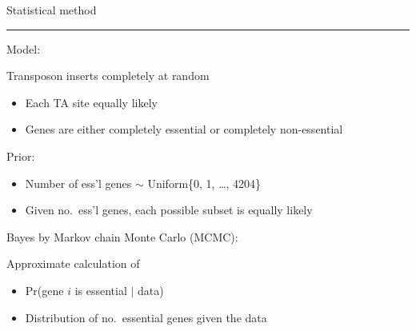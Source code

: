 \documentclass[12pt]{article}
\newcommand{\headsize}{\fontsize{35}{35} \selectfont}
\newcommand{\textsize}{\fontsize{30}{35} \selectfont}
\newcommand{\smallsize}{\fontsize{25}{30} \selectfont}
\newcommand{\headcolor}{\color [cmyk]{0.72,0.67,0.33,0}}
\newcommand{\linecolor}{\color [named]{Thistle}}
\newcommand{\pointcolor}{\color [named]{Bittersweet}}
\begin{document}
\newpage

\headsize \headcolor
\centerline{Statistical method}
\linecolor \noindent \rule[3mm]{10in}{2mm}

\normalcolor \textsize 
\vspace{-8mm}

\begin{minipage}[t]{1in}
\vspace*{0mm}

{\pointcolor Model}: 
\end{minipage}
\hfill
\begin{minipage}[t]{8.5in}
\vspace*{0mm}

Transposon inserts completely at random

\begin{itemize} 
\smallsize
\setlength{\rightskip}{0pt plus 1fil} %

\item Each TA site equally likely
\item Genes are either completely essential or completely
non-essential
\end{itemize}
\end{minipage}

\vspace{10mm}
\begin{minipage}[t]{1in}
\vspace*{0mm}

{\pointcolor Prior}: 
\end{minipage}
\hfill 
\begin{minipage}[t]{8.5in}
\vspace*{0mm}

\begin{itemize} 
\smallsize
\setlength{\rightskip}{0pt plus 1fil} %

\item Number of ess'l genes $\sim$ Uniform\{0, 1, \dots, 4204\}
\item Given no.\ ess'l genes, each possible subset is equally likely
\end{itemize} 
\end{minipage}

\vspace{10mm}
{\pointcolor Bayes by Markov chain Monte Carlo (MCMC)}: 

\hfill
\begin{minipage}[t]{8.5in}
\vspace*{-5mm}
Approximate calculation of 

\begin{itemize} 
\smallsize
\setlength{\rightskip}{0pt plus 1fil} %

\item Pr(gene $i$ is essential $|$ data)
\item Distribution of no.\ essential genes given the data
\end{itemize} 
\end{minipage}
\end{document}
